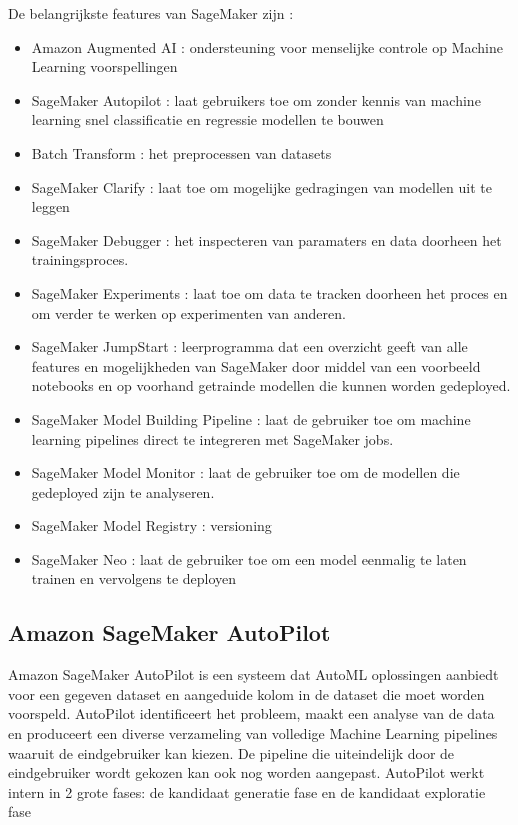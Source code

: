 De belangrijkste features van SageMaker zijn : 
\begin{itemize}
    \item Amazon Augmented AI : ondersteuning voor menselijke controle op Machine Learning voorspellingen
    \item SageMaker Autopilot : laat gebruikers toe om zonder kennis van machine learning snel classificatie en regressie modellen te bouwen
    \item Batch Transform : het  preprocessen van datasets
    \item SageMaker Clarify : laat toe om mogelijke gedragingen van modellen uit te leggen 
    \item SageMaker Debugger : het inspecteren van paramaters en data doorheen het trainingsproces. 
    \item SageMaker Experiments : laat toe om data te tracken doorheen het proces en om verder te werken op experimenten van anderen. 
    \item SageMaker JumpStart : leerprogramma dat een overzicht geeft van alle features en mogelijkheden van SageMaker door middel van een voorbeeld notebooks en op voorhand getrainde modellen die kunnen worden gedeployed. 
    \item SageMaker Model Building Pipeline : laat de gebruiker toe om machine learning pipelines direct te integreren met SageMaker jobs. 
    \item SageMaker Model Monitor : laat de gebruiker toe om de modellen die gedeployed zijn te analyseren. 
    \item SageMaker Model Registry : versioning
    \item SageMaker Neo : laat de gebruiker toe om een model eenmalig te laten trainen en vervolgens te deployen
\end{itemize}
\autocite{AWS2023}

\subsection{Amazon SageMaker AutoPilot}
Amazon SageMaker AutoPilot is een systeem dat AutoML oplossingen aanbiedt voor een gegeven dataset en aangeduide kolom in de dataset die moet worden voorspeld. AutoPilot identificeert het probleem, maakt een analyse van de data en produceert een diverse verzameling van volledige Machine Learning pipelines waaruit de eindgebruiker kan kiezen. De pipeline die uiteindelijk door de eindgebruiker wordt gekozen kan ook nog worden aangepast. 
AutoPilot werkt intern in 2 grote fases: de kandidaat generatie fase en de kandidaat exploratie fase

